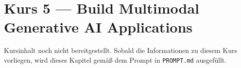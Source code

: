 \chapter{Kurs 5 --- Build Multimodal Generative AI Applications}

\begin{luecke}
Kursinhalt noch nicht bereitgestellt. Sobald die Informationen zu diesem Kurs vorliegen,
wird dieses Kapitel gem\"a\ss{} dem Prompt in \texttt{PROMPT.md} ausgef\"ullt.
\end{luecke}

